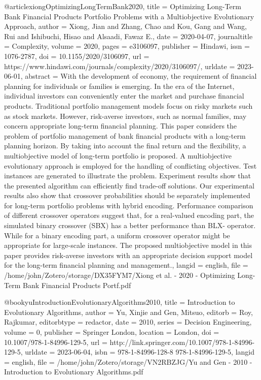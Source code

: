 \begin{thebibliography}
@article{xiongOptimizingLongTermBank2020,
  title = {Optimizing {{Long-Term Bank Financial Products Portfolio Problems}} with a {{Multiobjective Evolutionary Approach}}},
  author = {Xiong, Jian and Zhang, Chao and Kou, Gang and Wang, Rui and Ishibuchi, Hisao and Alsaadi, Fawaz E.},
  date = {2020-04-07},
  journaltitle = {Complexity},
  volume = {2020},
  pages = {e3106097},
  publisher = {{Hindawi}},
  issn = {1076-2787},
  doi = {10.1155/2020/3106097},
  url = {https://www.hindawi.com/journals/complexity/2020/3106097/},
  urldate = {2023-06-01},
  abstract = {With the development of economy, the requirement of financial planning for individuals or families is emerging. In the era of the Internet, individual investors can conveniently enter the market and purchase financial products. Traditional portfolio management models focus on risky markets such as stock markets. However, risk-averse investors, such as normal families, may concern appropriate long-term financial planning. This paper considers the problem of portfolio management of bank financial products with a long-term planning horizon. By taking into account the final return and the flexibility, a multiobjective model of long-term portfolio is proposed. A multiobjective evolutionary approach is employed for the handling of conflicting objectives. Test instances are generated to illustrate the problem. Experiment results show that the presented algorithm can efficiently find trade-off solutions. Our experimental results also show that crossover probabilities should be separately implemented for long-term portfolio problems with hybrid encoding. Performance comparison of different crossover operators suggest that, for a real-valued encoding part, the simulated binary crossover (SBX) has a better performance than BLX- operator. While for a binary encoding part, a uniform crossover operator might be appropriate for large-scale instances. The proposed multiobjective model in this paper provides risk-averse investors with an appropriate decision support model for the long-term financial planning and management.},
  langid = {english},
  file = {/home/john/Zotero/storage/DX35FYM7/Xiong et al. - 2020 - Optimizing Long-Term Bank Financial Products Portf.pdf}
}

@book{yuIntroductionEvolutionaryAlgorithms2010,
  title = {Introduction to {{Evolutionary Algorithms}}},
  author = {Yu, Xinjie and Gen, Mitsuo},
  editorb = {Roy, Rajkumar},
  editorbtype = {redactor},
  date = {2010},
  series = {Decision {{Engineering}}},
  volume = {0},
  publisher = {{Springer London}},
  location = {{London}},
  doi = {10.1007/978-1-84996-129-5},
  url = {http://link.springer.com/10.1007/978-1-84996-129-5},
  urldate = {2023-06-04},
  isbn = {978-1-84996-128-8 978-1-84996-129-5},
  langid = {english},
  file = {/home/john/Zotero/storage/VN2RBZJG/Yu and Gen - 2010 - Introduction to Evolutionary Algorithms.pdf}
}
 

\end{thebibliography}
